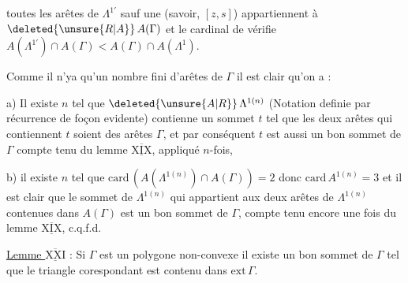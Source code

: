 toutes les  arêtes de $\Lambda^{1'}$ sauf une (savoir, $[z,s]$) appartiennent à $\deleted{\unsure{R|A}}\,A(\Gamma)$ et le cardinal de vérifie $A(\Lambda^{1'})\cap A(\Gamma)<A(\Gamma)\cap A(\Lambda^1)$.

Comme il n'ya qu'un nombre fini d'arêtes de $\Gamma$ il est clair qu'on  a :

a) Il existe $n$ tel que $\deleted{\unsure{A|R}}\,\Lambda^{1(n)}$ (Notation definie par récurrence de foçon evidente) contienne un  sommet $t$ tel que les deux arêtes qui contiennent $t$ soient des arêtes $\Gamma$, et par conséquent $t$ est aussi un bon sommet de $\Gamma$ compte tenu du lemme $\overline{\underline{\mathrm{XIX}}}$, appliqué $n$-fois, 

b) il existe $n$ tel que $\mathrm{card}\,(A({\Lambda}^{1(n)})\cap A(\Gamma))=2$ donc $\mathrm{card}\,A^{1(n)}=3$ et il est clair que le  sommet de $\Lambda^{1(n)}$ qui appartient aux deux arêtes de $\Lambda^{1(n)}$ contenues dans $A(\Gamma)$ est un bon sommet de $\Gamma$, compte tenu encore une fois du lemme $\overline{\underline{\mathrm{XIX}}}$, c.q.f.d.

\uline{Lemme $\overline{\underline{\mathrm{XXI}}}$} : Si $\Gamma$ est un polygone non-convexe il existe un bon sommet de $\Gamma$ tel que le  triangle corespondant est contenu dans $\mathrm{ext}\,\Gamma$.

